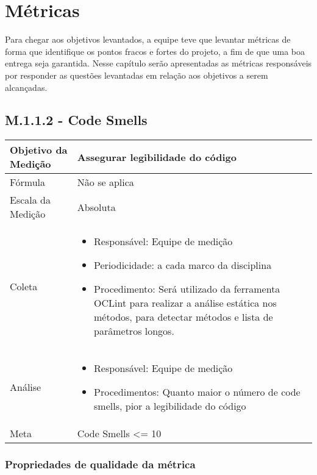\chapter{Métricas}
	
	Para chegar aos objetivos levantados, a equipe teve que levantar métricas de forma que identifique os pontos fracos e fortes do projeto, a fim de que uma boa entrega seja garantida.
	Nesse capítulo serão apresentadas as métricas responsáveis por responder as questões levantadas em relação aos objetivos a serem alcançadas.

\section{M.1.1.2 - Code Smells} %

	\begin{tabular}{ |p{4cm}|p{8cm}|  }
	 \hline
	 Objetivo da Medição 		& 	 Assegurar legibilidade do código  \\
	 \hline
	 Fórmula		& 	Não se aplica	\\
	 \hline
	 Escala da Medição 		& 	Absoluta	 \\
	 \hline
	 Coleta		& 	\begin{itemize} \item Responsável: Equipe de medição \item Periodicidade: a cada marco da disciplina \item Procedimento: Será utilizado da ferramenta OCLint para realizar a análise estática nos métodos, para detectar métodos e lista de parâmetros longos. \end{itemize} \\
	 \hline
	 Análise		& 	\begin{itemize} \item Responsável: Equipe de medição \item Procedimentos: Quanto maior o número de code smells, pior a legibilidade do código \end{itemize} 	 \\
	 \hline
	 Meta		& 	Code Smells <= 10	 \\
	 \hline
	\end{tabular}

	\subsection{Propriedades de qualidade da métrica}

